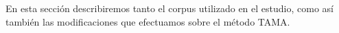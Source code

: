 En esta sección describiremos tanto el corpus utilizado en el estudio, como así también las modificaciones que efectuamos sobre el método TAMA.







